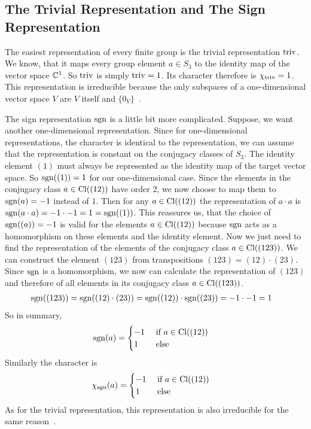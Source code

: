 \subsection{The Trivial Representation and The Sign Representation}

The easiest representation of every finite group is the trivial representation $\operatorname{triv}$.
We know, that it maps every group element $a \in S_3$ to the identity map of the vector space $\mathbb{C}^1$.
So $\operatorname{triv}$ is simply $\operatorname{triv} = 1$.
Its character therefore is $\chi_{\operatorname{triv}} = 1$.
This representation is irreducible because the only subspaces of a one-dimensional vector space $V$ are $V$ itself and $\{0_V\}$~\cite{fulton2013}.

The sign representation $\operatorname{sgn}$ is a little bit more complicated.
Suppose, we want another one-dimensional representation.
Since for one-dimensional representations, the character is identical to the representation, we can assume that the representation is constant on the conjugacy classes of $S_3$.
The identity element $(1)$ must always be represented as the identity map of the target vector space.
So $\operatorname{sgn}((1)) = 1$ for our one-dimensional case.
Since the elements in the conjugacy class $a \in \operatorname{Cl}((12))$ have order 2, we now choose to map them to $\operatorname{sgn}(a) = -1$ instead of $1$.
Then for any $a \in \operatorname{Cl}((12))$ the representation of $a \cdot a$ is $\operatorname{sgn}(a \cdot a) = -1 \cdot -1 = 1 = \operatorname{sgn}((1))$.
This reassures us, that the choice of $\operatorname{sgn}((a)) = -1$ is valid for the elements $a \in \operatorname{Cl}((12))$ because $\operatorname{sgn}$ acts as a homomorphism on these elements and the identity element.
Now we just need to find the representation of the elements of the conjugacy class $a \in \operatorname{Cl}((123))$.
We can construct the element $(123)$ from transpositions $(123) = (12) \cdot (23)$.
Since $\operatorname{sgn}$ is a homomorphism, we now can calculate the representation of $(123)$ and therefore of all elements in its conjugacy class $a \in \operatorname{Cl}((123))$.
\begin{align}
    \operatorname{sgn}((123)) & = \operatorname{sgn}((12) \cdot (23)) = \operatorname{sgn}((12)) \cdot \operatorname{sgn}((23))  = -1 \cdot -1 = 1
\end{align}
So in summary,
\begin{align}
    \operatorname{sgn}(a) & = \begin{cases}
        -1 & \text{ if } a \in \operatorname{Cl}((12)) \\
        1 & \text{ else}
    \end{cases}
\end{align}
Similarly the character is
\begin{align}
    \chi_{\operatorname{sgn}}(a) & = \begin{cases}
        -1 & \text{ if } a \in \operatorname{Cl}((12)) \\
        1 & \text{ else}
    \end{cases}
\end{align}
As for the trivial representation, this representation is also irreducible for the same reason~\cite{fulton2013}.

